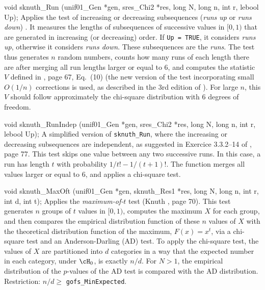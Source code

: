 void sknuth_Run (unif01_Gen *gen, sres_Chi2 *res,
                 long N, long n, int r, lebool Up);
\endcode
  \tab  Applies the test of increasing
   or decreasing subsequences ({\em runs up\/} or {\em runs down\/}) 
   \cite{rKER37a,rLEV44a,rKNU98a}.
   It measures the lengths of subsequences of successive values in $[0,1)$
   that are generated in increasing (or decreasing) order. If {\tt Up = TRUE},
   it considers {\em runs up}, otherwise it considers {\em runs down}.
   These subsequences are the {\em runs}.
   The test thus generates $n$ random numbers, counts how many runs of each length 
   there are after merging all run lengths larger or equal to 6,
   and computes the statistic $V$ defined in \cite{rKNU98a}, page 67, Eq.\ (10)
   (the new version of the test incorporating small $O(1/n)$ corrections is used,
   as described in the 3rd edition of \cite{rKNU98a}).
   For large $n$, this $V$ should follow approximately the chi-square
   distribution with 6 degrees of freedom. 
 \endtab
\code


void sknuth_RunIndep (unif01_Gen *gen, sres_Chi2 *res,
                      long N, long n, int r, lebool Up);
\endcode
  \tab  A simplified version of {\tt sknuth\_Run},
   where the increasing or decreasing subsequences are independent,
   as suggested in Exercice 3.3.2--14 of \cite{rKNU98a}, page 77.
   This test skips one value between any two successive runs.
   In this case, a run has length $t$ with probability
   $1/t! - 1/(t+1)!$.  The function merges all values larger 
   or equal to 6, and applies a chi-square  test.
 \endtab
\code


void sknuth_MaxOft (unif01_Gen *gen, sknuth_Res1 *res,
                    long N, long n, int r, int d, int t);
\endcode
  \tab  Applies the {\em maximum-of-$t$} test
   (Knuth \cite{rKNU98a}, page 70).  
   This test generates $n$ groups of $t$ values in $[0,1)$,
   computes the maximum $X$ for each group, and then compares the 
   empirical distribution function of these $n$ values of $X$ with
   the theoretical distribution function of the maximum, $F(x)=x^t$,
   via a chi-square test and an Anderson-Darling (AD) test.
   To apply the chi-square test, the values of $X$ are partitioned 
   into $d$ categories
   in a way that the expected number in each category, 
   under $\cH_0$, is exactly $n/d$.  
   For $N > 1$, the empirical distribution of the $p$-values of the 
   AD test is compared with the AD distribution.
   Restriction: $n/d \ge$ {\tt gofs\_MinExpected}.
\endtab
\code


